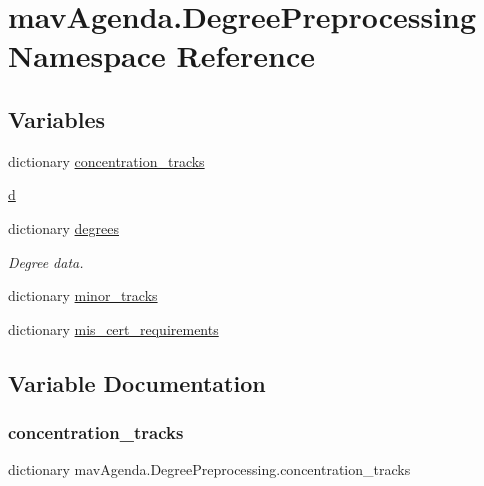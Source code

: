 \hypertarget{namespacemavAgenda_1_1DegreePreprocessing}{}\section{mav\+Agenda.\+Degree\+Preprocessing Namespace Reference}
\label{namespacemavAgenda_1_1DegreePreprocessing}
\subsection*{Variables}
\begin{DoxyCompactItemize}
\item 
dictionary \mbox{\hyperlink{namespacemavAgenda_1_1DegreePreprocessing_aa0f413e2b6b55f9271b32afe01250fd6}{concentration\+\_\+tracks}}
\item 
\mbox{\hyperlink{namespacemavAgenda_1_1DegreePreprocessing_a9391b9dbb13717ada260004b0d8ce62b}{d}}
\item 
dictionary \mbox{\hyperlink{namespacemavAgenda_1_1DegreePreprocessing_a9211e5530909400d8a6c686011822a43}{degrees}}
\begin{DoxyCompactList}\small\item\em Degree data. \end{DoxyCompactList}\item 
dictionary \mbox{\hyperlink{namespacemavAgenda_1_1DegreePreprocessing_a7248b951059f4a9ad766000590ecb727}{minor\+\_\+tracks}}
\item 
dictionary \mbox{\hyperlink{namespacemavAgenda_1_1DegreePreprocessing_a0dc9af5c79d9e5db222b8eb43ea009ce}{mis\+\_\+cert\+\_\+requirements}}
\end{DoxyCompactItemize}


\subsection{Variable Documentation}
\mbox{\label{namespacemavAgenda_1_1DegreePreprocessing_aa0f413e2b6b55f9271b32afe01250fd6}} 
\subsubsection{\texorpdfstring{concentration\+\_\+tracks}{concentration\_tracks}}
{\footnotesize\ttfamily dictionary mav\+Agenda.\+Degree\+Preprocessing.\+concentration\+\_\+tracks}

